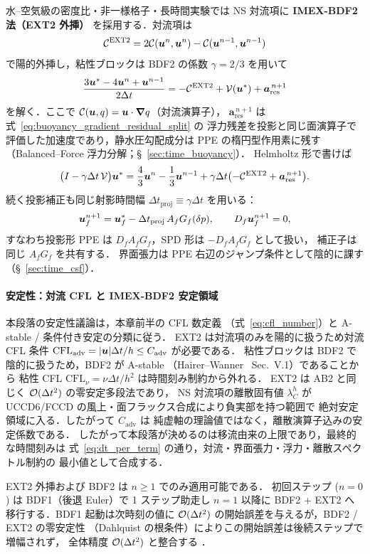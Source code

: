 水--空気級の密度比・非一様格子・長時間実験では NS 対流項に
\textbf{IMEX-BDF2 法（EXT2 外挿）} を採用する．対流項は
\[
  \mathcal{C}^{\mathrm{EXT2}}
  = 2\mathcal{C}(\bm{u}^n,\bm{u}^n)
    - \mathcal{C}(\bm{u}^{n-1},\bm{u}^{n-1})
\]
で陽的外挿し，粘性ブロックは BDF2 の係数 $\gamma=2/3$ を用いて
\begin{equation}
  \frac{3\bm{u}^* - 4\bm{u}^n + \bm{u}^{n-1}}{2\Delta t}
  = -\mathcal{C}^{\mathrm{EXT2}}
    + \mathcal{V}(\bm{u}^*)
    + \bm{a}^{\,n+1}_{\mathrm{res}}
  \label{eq:predictor_imex_bdf2}
\end{equation}
を解く．ここで $\mathcal{C}(\bm{u},q) = \bm{u}\cdot\bm{\nabla} q$（対流演算子），
$\bm{a}^{\,n+1}_{\mathrm{res}}$ は式~\eqref{eq:buoyancy_gradient_residual_split} の
浮力残差を投影と同じ面演算子で評価した加速度であり，静水圧勾配成分は
PPE の楕円型作用素に残す（Balanced--Force 浮力分解；§~\ref{sec:time_buoyancy}）．
Helmholtz 形で書けば
\[
  \bigl(I-\gamma\Delta t\,\mathcal{V}\bigr)\bm{u}^*
  =
  \frac{4}{3}\bm{u}^n-\frac{1}{3}\bm{u}^{n-1}
  +\gamma\Delta t\bigl(-\mathcal{C}^{\mathrm{EXT2}}
  +\bm{a}^{\,n+1}_{\mathrm{res}}\bigr).
\]
続く投影補正も同じ射影時間幅
$\Delta t_{\mathrm{proj}}\equiv\gamma\Delta t$ を用いる：
\begin{equation}
  \bm{u}_f^{n+1}
  = \bm{u}_f^* - \Delta t_{\mathrm{proj}}\,A_f G_f(\delta p),\qquad
  D_f\bm{u}_f^{n+1}=0,
  \label{eq:projection_imex_bdf2_dt}
\end{equation}
すなわち投影形 PPE は $D_f A_f G_f$，SPD 形は $-D_f A_f G_f$ として扱い，
補正子は同じ $A_fG_f$ を共有する．
界面張力は PPE 右辺のジャンプ条件として陰的に課す（§~\ref{sec:time_csf}）．

\paragraph{安定性：対流 CFL と IMEX-BDF2 安定領域}
本段落の安定性議論は，本章前半の CFL 数定義
（式~\eqref{eq:cfl_number}）と A-stable / 条件付き安定の分類に従う．
EXT2 は対流項のみを陽的に扱うため対流 CFL 条件
$\mathrm{CFL}_{\mathrm{adv}} = |\bm{u}|\Delta t/h \le C_{\mathrm{adv}}$ が必要である．
粘性ブロックは BDF2 で陰的に扱うため，BDF2 が A-stable
（Hairer--Wanner~\cite{HairerWanner1996} Sec.~V.1）であることから
粘性 CFL $\mathrm{CFL}_{\nu}=\nu\Delta t/h^2$ は時間刻み制約から外れる．
EXT2 は AB2 と同じく $\mathcal{O}(\Delta t^2)$ の零安定多段法であり，
NS 対流項の離散固有値 $\lambda_C^h$ が
UCCD6/FCCD の風上・面フラックス合成により負実部を持つ範囲で
絶対安定領域に入る．したがって $C_{\mathrm{adv}}$ は
純虚軸の理論値ではなく，離散演算子込みの安定係数である．
したがって本段落が決めるのは移流由来の上限であり，最終的な時間刻みは
式~\eqref{eq:dt_per_term} の通り，対流・界面張力・浮力・離散スペクトル制約の
最小値として合成する．

\begin{tcolorbox}[warnbox, title={IMEX-BDF2 / EXT2 起動問題（$n=0,1$）}]
\label{warn:bdf2_startup}
EXT2 外挿および BDF2 は $n\ge 1$ でのみ適用可能である．
初回ステップ ($n=0$) は BDF1（後退 Euler）で 1 ステップ助走し
$n=1$ 以降に BDF2 + EXT2 へ移行する．BDF1 起動は次時刻の値に
$\mathcal{O}(\Delta t^2)$ の開始誤差を与えるが，BDF2 / EXT2 の零安定性
（Dahlquist の根条件）によりこの開始誤差は後続ステップで増幅されず，
全体精度 $\mathcal{O}(\Delta t^2)$ と整合する \cite{DahlquistBjorck1974}．
\end{tcolorbox}

